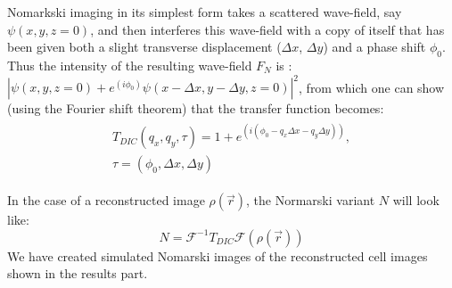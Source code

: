 Nomarkski imaging in its simplest form takes a scattered wave-field, say $\psi(x,y,z = 0)$, and then interferes this wave-field with a copy of itself that has been given both a slight transverse displacement ($\Delta x$, $\Delta y$) and a phase shift $\phi_0$. Thus the intensity of the resulting wave-field $F_N$ is \cite{Paganin2004}:
$|\psi(x,y,z=0)+ e^{(i\phi_0)} \psi(x - \Delta x,y - \Delta y,z=0) |^2$, from which one can show (using the Fourier shift theorem) that the transfer function becomes:
\begin{equation}
\begin{aligned}
\begin{split}
T_{DIC}(q_x, q_y, \tau) = 1 + e^{(i(\phi_0 - q_x \Delta x - q_y \Delta y))},\\
\tau = (\phi_0, \Delta x, \Delta y)
\end{split}
\end{aligned}
\end{equation}

In the case of a reconstructed image $\rho(\vec{r})$, the Normarski variant $N$ will look like:
\begin{equation}
N = \mathcal{F}^{-1} T_{DIC} \mathcal{F}(\rho(\vec{r}))
\end{equation}
We have created simulated Nomarski images of the reconstructed cell images shown in the results part.



